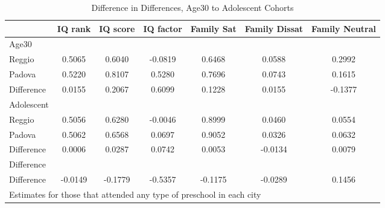 \begin{table}[htbp]\centering
\caption{Difference in Differences, Age30 to Adolescent Cohorts}
\begin{tabular}{l*{6}{c}}
\hline\hline
            &     IQ rank&    IQ score&   IQ factor&  Family Sat&Family Dissat&Family Neutral\\
\hline
Age30       &            &            &            &            &            &            \\
Reggio      &      0.5065&      0.6040&     -0.0819&      0.6468&      0.0588&      0.2992\\
Padova      &      0.5220&      0.8107&      0.5280&      0.7696&      0.0743&      0.1615\\
Difference  &      0.0155&      0.2067&      0.6099&      0.1228&      0.0155&     -0.1377\\
\hline
Adolescent  &            &            &            &            &            &            \\
Reggio      &      0.5056&      0.6280&     -0.0046&      0.8999&      0.0460&      0.0554\\
Padova      &      0.5062&      0.6568&      0.0697&      0.9052&      0.0326&      0.0632\\
Difference  &      0.0006&      0.0287&      0.0742&      0.0053&     -0.0134&      0.0079\\
\hline
Difference  &            &            &            &            &            &            \\
Difference  &     -0.0149&     -0.1779&     -0.5357&     -0.1175&     -0.0289&      0.1456\\
\hline\hline
\multicolumn{7}{l}{\footnotesize Estimates for those that attended any type of preschool in each city}\\
\end{tabular}
\end{table}
